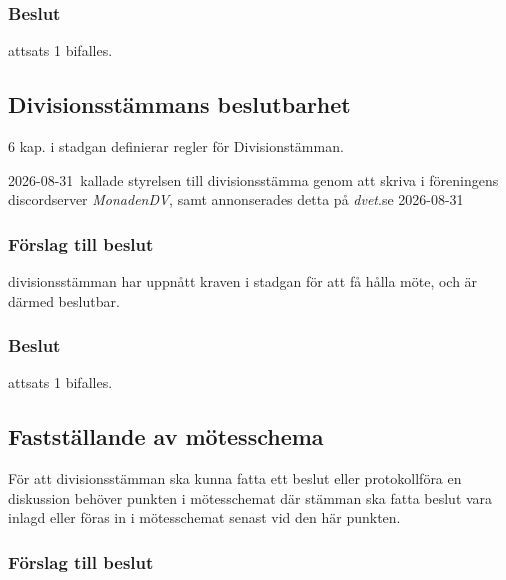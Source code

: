\documentclass[protokoll]{dvd}
\def\kall{2026-08-31}
\begin{document}
\subsubsection*{Beslut}
\begin{attsatser}
    \item attsats 1 bifalles.
\end{attsatser}


\subsection{Divisionsstämmans beslutbarhet}

6 kap. i stadgan definierar regler för Divisionstämman.

\kall \ 
kallade styrelsen till divisionsstämma genom att skriva i föreningens discordserver \emph{MonadenDV}, samt annonserades detta på \emph{dvet}.se \kall

\subsubsection*{Förslag till beslut}

\begin{attsatser}
    \item divisionsstämman har uppnått kraven i stadgan för att få hålla möte, och är därmed beslutbar.
\end{attsatser}

\subsubsection*{Beslut}
\begin{attsatser}
    \item attsats 1 bifalles.
\end{attsatser}


\subsection{Fastställande av mötesschema}

För att divisionsstämman ska kunna fatta ett beslut eller protokollföra en diskussion behöver punkten i mötesschemat där stämman ska fatta beslut vara inlagd eller föras in i mötesschemat senast vid den här punkten.

\subsubsection*{Förslag till beslut}
\end{document}
